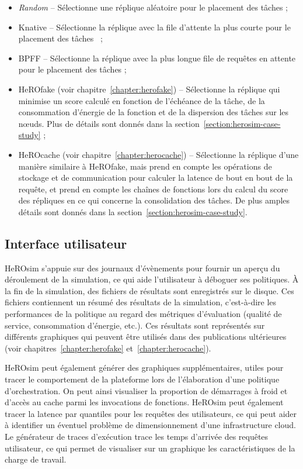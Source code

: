 \begin{itemize}
    \item \textit{Random} -- Sélectionne une réplique aléatoire pour le placement des tâches ;
    \item Knative -- Sélectionne la réplique avec la file d'attente la plus courte pour le placement des tâches~\cite{sureshENSUREEfficientScheduling2020} ;
    \item \gls{BPFF} -- Sélectionne la réplique avec la plus longue file de requêtes en attente pour le placement des tâches ;
    \item HeROfake (voir chapitre~\ref{chapter:herofake}) -- Sélectionne la réplique qui minimise un score calculé en fonction de l'échéance de la tâche, de la consommation d'énergie de la fonction et de la dispersion des tâches sur les nœuds. Plus de détails sont donnés dans la section~\ref{section:herosim-case-study} ;
    \item HeROcache (voir chapitre~\ref{chapter:herocache}) -- Sélectionne la réplique d'une manière similaire à HeROfake, mais prend en compte les opérations de stockage et de communication pour calculer la latence de bout en bout de la requête, et prend en compte les chaînes de fonctions lors du calcul du score des répliques en ce qui concerne la consolidation des tâches. De plus amples détails sont donnés dans la section~\ref{section:herosim-case-study}.
\end{itemize}

\subsection{Interface utilisateur}

HeROsim s'appuie sur des journaux d'évènements pour fournir un aperçu du déroulement de la simulation, ce qui aide l'utilisateur à déboguer ses politiques. À la fin de la simulation, des fichiers de résultats sont enregistrés sur le disque. Ces fichiers contiennent un résumé des résultats de la simulation, c'est-à-dire les performances de la politique au regard des métriques d'évaluation (qualité de service, consommation d'énergie, etc.). Ces résultats sont représentés sur différents graphiques qui peuvent être utilisés dans des publications ultérieures (voir chapitres~\ref{chapter:herofake} et~\ref{chapter:herocache}).

HeROsim peut également générer des graphiques supplémentaires, utiles pour tracer le comportement de la plateforme lors de l'élaboration d'une politique d'orchestration. On peut ainsi visualiser la proportion de démarrages à froid et d'accès au cache parmi les invocations de fonctions. HeROsim peut également tracer la latence par quantiles pour les requêtes des utilisateurs, ce qui peut aider à identifier un éventuel problème de dimensionnement d'une infrastructure cloud. Le générateur de traces d'exécution trace les temps d'arrivée des requêtes utilisateur, ce qui permet de visualiser sur un graphique les caractéristiques de la charge de travail.

